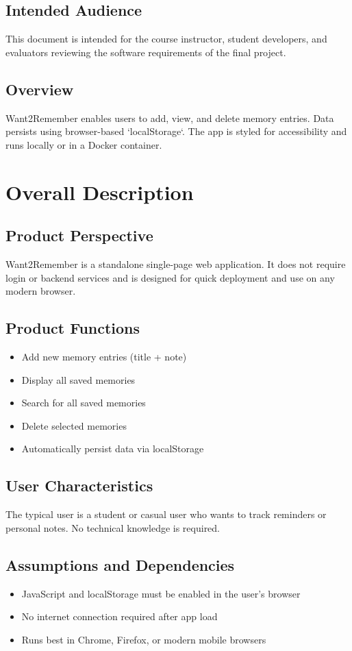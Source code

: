 \documentclass[12pt]{article}
\begin{document}
\subsection*{Intended Audience}
This document is intended for the course instructor, student developers, and evaluators reviewing the software requirements of the final project.

\subsection*{Overview}
Want2Remember enables users to add, view, and delete memory entries. Data persists using browser-based `localStorage`. The app is styled for accessibility and runs locally or in a Docker container.

\section{Overall Description}
\subsection*{Product Perspective}
Want2Remember is a standalone single-page web application. It does not require login or backend services and is designed for quick deployment and use on any modern browser.

\subsection*{Product Functions}
\begin{itemize}
    \item Add new memory entries (title + note)
    \item Display all saved memories
    \item Search for all saved memories
    \item Delete selected memories
    \item Automatically persist data via localStorage
\end{itemize}

\subsection*{User Characteristics}
The typical user is a student or casual user who wants to track reminders or personal notes. No technical knowledge is required.

\subsection*{Assumptions and Dependencies}
\begin{itemize}
    \item JavaScript and localStorage must be enabled in the user’s browser
    \item No internet connection required after app load
    \item Runs best in Chrome, Firefox, or modern mobile browsers
\end{itemize}
\end{document}
